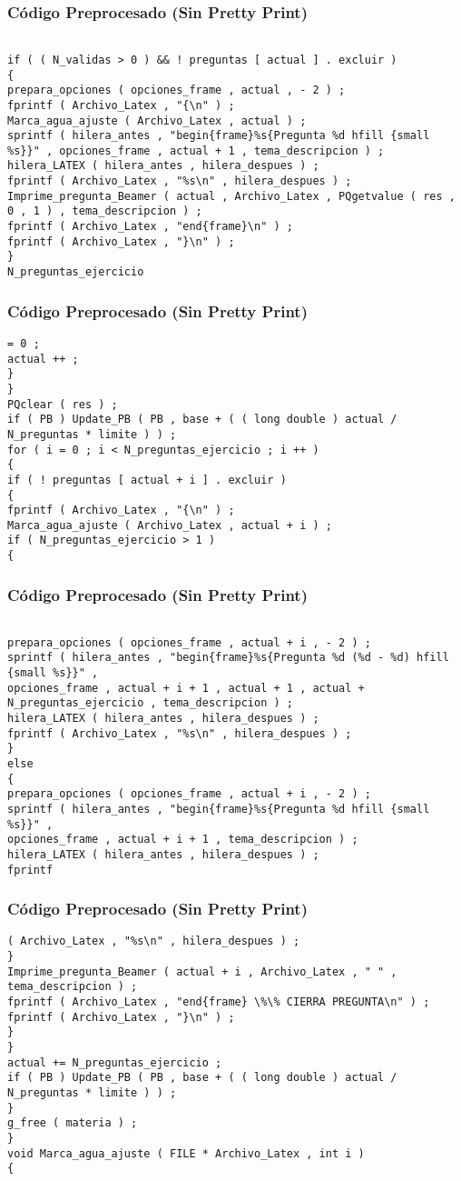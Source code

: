 \documentclass{beamer}
\begin{document}
\begin{frame}[fragile]
\frametitle{C\'odigo Preprocesado (Sin Pretty Print)}
\begin{lstlisting}[style=CStyle]

if ( ( N_validas > 0 ) && ! preguntas [ actual ] . excluir ) 
{ 
prepara_opciones ( opciones_frame , actual , - 2 ) ; 
fprintf ( Archivo_Latex , "{\n" ) ; 
Marca_agua_ajuste ( Archivo_Latex , actual ) ; 
sprintf ( hilera_antes , "begin{frame}%s{Pregunta %d hfill {small %s}}" , opciones_frame , actual + 1 , tema_descripcion ) ; 
hilera_LATEX ( hilera_antes , hilera_despues ) ; 
fprintf ( Archivo_Latex , "%s\n" , hilera_despues ) ; 
Imprime_pregunta_Beamer ( actual , Archivo_Latex , PQgetvalue ( res , 0 , 1 ) , tema_descripcion ) ; 
fprintf ( Archivo_Latex , "end{frame}\n" ) ; 
fprintf ( Archivo_Latex , "}\n" ) ; 
} 
N_preguntas_ejercicio \end{lstlisting}
\end{frame}
\begin{frame}[fragile]
\frametitle{C\'odigo Preprocesado (Sin Pretty Print)}
\begin{lstlisting}[style=CStyle]
= 0 ; 
actual ++ ; 
} 
} 
PQclear ( res ) ; 
if ( PB ) Update_PB ( PB , base + ( ( long double ) actual / N_preguntas * limite ) ) ; 
for ( i = 0 ; i < N_preguntas_ejercicio ; i ++ ) 
{ 
if ( ! preguntas [ actual + i ] . excluir ) 
{ 
fprintf ( Archivo_Latex , "{\n" ) ; 
Marca_agua_ajuste ( Archivo_Latex , actual + i ) ; 
if ( N_preguntas_ejercicio > 1 ) 
{ \end{lstlisting}
\end{frame}
\begin{frame}[fragile]
\frametitle{C\'odigo Preprocesado (Sin Pretty Print)}
\begin{lstlisting}[style=CStyle]

prepara_opciones ( opciones_frame , actual + i , - 2 ) ; 
sprintf ( hilera_antes , "begin{frame}%s{Pregunta %d (%d - %d) hfill {small %s}}" , 
opciones_frame , actual + i + 1 , actual + 1 , actual + N_preguntas_ejercicio , tema_descripcion ) ; 
hilera_LATEX ( hilera_antes , hilera_despues ) ; 
fprintf ( Archivo_Latex , "%s\n" , hilera_despues ) ; 
} 
else 
{ 
prepara_opciones ( opciones_frame , actual + i , - 2 ) ; 
sprintf ( hilera_antes , "begin{frame}%s{Pregunta %d hfill {small %s}}" , 
opciones_frame , actual + i + 1 , tema_descripcion ) ; 
hilera_LATEX ( hilera_antes , hilera_despues ) ; 
fprintf \end{lstlisting}
\end{frame}
\begin{frame}[fragile]
\frametitle{C\'odigo Preprocesado (Sin Pretty Print)}
\begin{lstlisting}[style=CStyle]
( Archivo_Latex , "%s\n" , hilera_despues ) ; 
} 
Imprime_pregunta_Beamer ( actual + i , Archivo_Latex , " " , tema_descripcion ) ; 
fprintf ( Archivo_Latex , "end{frame} \%\% CIERRA PREGUNTA\n" ) ; 
fprintf ( Archivo_Latex , "}\n" ) ; 
} 
} 
actual += N_preguntas_ejercicio ; 
if ( PB ) Update_PB ( PB , base + ( ( long double ) actual / N_preguntas * limite ) ) ; 
} 
g_free ( materia ) ; 
} 
void Marca_agua_ajuste ( FILE * Archivo_Latex , int i ) 
{ \end{lstlisting}
\end{frame}
\end{document}
